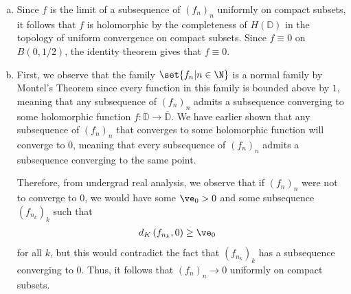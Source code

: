\documentclass[10pt]{mypackage}
\renewcommand{\D}{\mathbb{D}}
\begin{document}
\begin{solution}\hfill
  \begin{enumerate}[(a)]
    \item Since $f$ is the limit of a subsequence of $\left( f_n \right)_n$ uniformly on compact subsets, it follows that $f$ is holomorphic by the completeness of $H\left( \D \right)$ in the topology of uniform convergence on compact subsets. Since $f \equiv 0$ on $B\left( 0,1/2 \right)$, the identity theorem gives that $f\equiv 0$.
    \item First, we observe that the family $\set{f_n | n\in\N}$ is a normal family by Montel's Theorem since every function in this family is bounded above by $1$, meaning that any subsequence of $\left( f_{n} \right)_n$ admits a subsequence converging to some holomorphic function $f\colon \D\rightarrow \overline{\D}$. We have earlier shown that any subsequence of $\left( f_n \right)_n$ that converges to some holomorphic function will converge to $0$, meaning that every subsequence of $\left( f_n \right)_n$ admits a subsequence converging to the same point.%

      Therefore, from undergrad real analysis, we observe that if $\left( f_n \right)_n$ were not to converge to $0$, we would have some $\ve_0 > 0$ and some subsequence $\left( f_{n_k} \right)_k$ such that
      \begin{align*}
        d_K\left( f_{n_k},0 \right) &\geq \ve_0
      \end{align*}
      for all $k$, but this would contradict the fact that $\left( f_{n_k} \right)_k$ has a subsequence converging to $0$. Thus, it follows that $\left( f_n \right)_n\rightarrow 0$ uniformly on compact subsets.
  \end{enumerate}
\end{solution}
\end{document}
